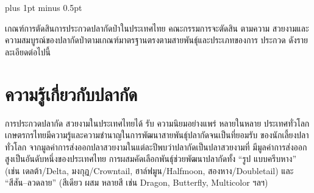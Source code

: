 
\clearpage
\thispagestyle{plain}

\begingroup
\fontsize{16pt}{19.2pt}\selectfont
\justifying
\XeTeXlinebreakskip=0pt plus 1pt minus 0.5pt
\setlength{\parindent}{1.5cm}
\setlength{\parskip}{0pt}

\par
\indent เกณฑ์การตัดสินการประกวดปลากัดป่าในประเทศไทย คณะกรรมการจะตัดสิน ตามความ
สวยงามและความสมบูรณ์ของปลากัดป่าตามเกณฑ์มาตรฐานตรงตามสายพันธุ์และประเภทของการ
ประกวด ดังรายละเอียดต่อไปนี้

\vspace{\baselineskip} %

\section*{ความรู้เกี่ยวกับปลากัด}

\indent การประกวดปลากัด สวยงามในประเทศไทยได้ รับ ความนิยมอย่างแพร่ หลายในหลาย
ประเทศทั่วโลก เกษตรกรไทยมีความรู้และความชำนาญในการพัฒนาสายพันธุ์ปลากัดจนเป็นที่ยอมรับ
ของนักเลี้ยงปลาทั่วโลก จากมูลค่าการส่งออกปลาสวยงามในแต่ละปีพบว่าปลากัดเป็นปลาสวยงามที่
มีมูลค่าการส่งออกสูงเป็นอันดับหนึ่งของประเทศไทย การผสมคัดเลือกพันธุ์ช่วยพัฒนาปลากัดทั้ง “รูป
แบบครีบหาง” (เช่น เดลต้า/Delta, มงกุฎ/Crowntail, ฮาล์ฟมูน/Halfmoon, สองหาง/Doubletail)
และ “สีสัน–ลวดลาย” (สีเดียว ผสม หลายสี เช่น Dragon, Butterfly, Multicolor ฯลฯ)


\begingroup
\renewcommand{\arraystretch}{1.15}
\setlength{\arrayrulewidth}{0.5pt}

\makeatletter
{}%
\makeatother
\renewcommand{\tablefont}{\fontsize{13pt}{15.6pt}\selectfont} %


